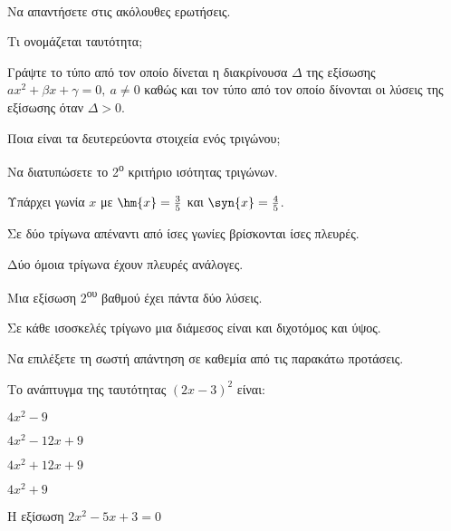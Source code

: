 \documentclass[twoside,nofonts,internet,math,spyros]{frontisthrio-diag}
\newcommand{\tss}[1]{\textsuperscript{#1}}
\begin{document}
\vspace{-5mm}
\begin{thema}
\item\mbox{}\\\vspace{-5mm}
\begin{erwthma}
\item Να απαντήσετε στις ακόλουθες ερωτήσεις.
\begin{alist}
\item Τι ονομάζεται ταυτότητα;
\item Γράψτε το τύπο από τον οποίο δίνεται η διακρίνουσα $ \varDelta $ της εξίσωσης $ ax^2+\beta x+\gamma=0,\ a\neq0 $ καθώς και τον τύπο από τον οποίο δίνονται οι λύσεις της εξίσωσης όταν $ \varDelta>0 $.
\item Ποια είναι τα δευτερεύοντα στοιχεία ενός τριγώνου;
\item Να διατυπώσετε το 2\tss{ο} κριτήριο ισότητας τριγώνων.
\end{alist}
\item \swstolathos
\begin{alist}
\item Υπάρχει γωνία $ x $ με $ \hm{x}=\frac{3}{5} $ και $ \syn{x}=\frac{4}{5} $.
\item Σε δύο τρίγωνα απέναντι από ίσες γωνίες βρίσκονται ίσες πλευρές.
\item Δύο όμοια τρίγωνα έχουν πλευρές ανάλογες.
\item Μια εξίσωση 2\tss{ου} βαθμού έχει πάντα δύο λύσεις.
\item Σε κάθε ισοσκελές τρίγωνο μια διάμεσος είναι και διχοτόμος και ύψος.
\end{alist}
\item Να επιλέξετε τη σωστή απάντηση σε καθεμία από τις παρακάτω προτάσεις.
\begin{alist}
\item Το ανάπτυγμα της ταυτότητας $ (2x-3)^2 $ είναι:
\begin{multicols}{4}
\begin{rlist}
\item $ 4x^2-9 $
\item $ 4x^2-12x+9 $
\item $ 4x^2+12x+9 $
\item $ 4x^2+9 $
\end{rlist}
\end{multicols}
\item Η εξίσωση $ 2x^2-5x+3=0 $

\end{alist}
\end{erwthma}
\end{thema}
\end{document}
